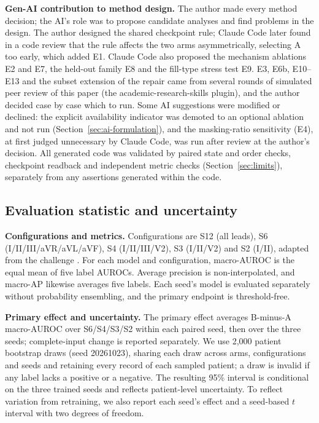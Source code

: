 \textbf{Gen-AI contribution to method design.} The author made every method decision; the AI's role was to propose candidate analyses and find problems in the design. The author designed the shared checkpoint rule; Claude Code later found in a code review that the rule affects the two arms asymmetrically, selecting A too early, which added E1. Claude Code also proposed the mechanism ablations E2 and E7, the held-out family E8 and the fill-type stress test E9. E3, E6b, E10--E13 and the subset extension of the repair came from several rounds of simulated peer review of this paper (the academic-research-skills plugin), and the author decided case by case which to run. Some AI suggestions were modified or declined: the explicit availability indicator was demoted to an optional ablation and not run (Section~\ref{sec:ai-formulation}), and the masking-ratio sensitivity (E4), at first judged unnecessary by Claude Code, was run after review at the author's decision. All generated code was validated by paired state and order checks, checkpoint readback and independent metric checks (Section~\ref{sec:limits}), separately from any assertions generated within the code.

\subsection{Evaluation statistic and uncertainty}

\textbf{Configurations and metrics.} Configurations are S12 (all leads), S6 (I/II/III/aVR/aVL/aVF), S4 (I/II/III/V2), S3 (I/II/V2) and S2 (I/II), adapted from the challenge \citep{reyna2022issues}. For each model and configuration, macro-AUROC is the equal mean of five label AUROCs. Average precision is non-interpolated, and macro-AP likewise averages five labels. Each seed's model is evaluated separately without probability ensembling, and the primary endpoint is threshold-free.

\textbf{Primary effect and uncertainty.} The primary effect averages B-minus-A macro-AUROC over S6/S4/S3/S2 within each paired seed, then over the three seeds; complete-input change is reported separately. We use 2,000 patient bootstrap draws (seed 20261023), sharing each draw across arms, configurations and seeds and retaining every record of each sampled patient; a draw is invalid if any label lacks a positive or a negative. The resulting 95\% interval is conditional on the three trained seeds and reflects patient-level uncertainty. To reflect variation from retraining, we also report each seed's effect and a seed-based $t$ interval with two degrees of freedom.

